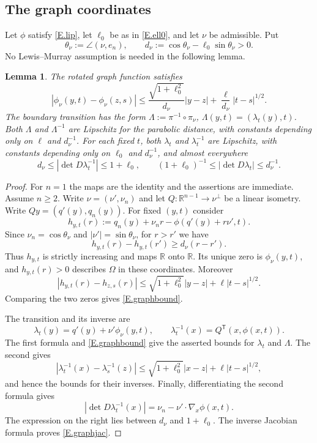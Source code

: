 \documentclass[10pt,a4paper]{amsart}
\numberwithin{equation}{section}
\newcommand{\R}{\mathbb R}
\newcommand{\om}{\Omega}
\newtheorem{lemma}[equation]{Lemma}
\begin{document}
\subsection{The graph coordinates}\label{ss.graphgeometry}

Let $\phi$ satisfy \eqref{E.lip}, let $\ell_0$ be as in \eqref{E.ell0}, and
let $\nu$ be admissible. Put
\begin{equation}\label{E.transversality}
 \theta_\nu:=\angle(\nu,e_n),\qquad
 d_\nu:=\cos\theta_\nu-\ell_0\sin\theta_\nu>0.
\end{equation}
No Lewis--Murray assumption is needed in the following lemma.

\begin{lemma}\label{L.graphgeometry}
The rotated graph function satisfies
\begin{equation}\label{E.graphbound}
 |\phi_\nu(y,t)-\phi_\nu(z,s)|
 \le \frac{\sqrt{1+\ell_0^2}}{d_\nu}|y-z|
      +\frac{\ell}{d_\nu}|t-s|^{1/2}.
\end{equation}
The boundary transition has the form
$\Lambda:=\pi^{-1}\circ\pi_\nu$, $\Lambda(y,t)=(\lambda_t(y),t)$.
Both $\Lambda$ and $\Lambda^{-1}$ are Lipschitz for the parabolic distance,
with constants depending only on $\ell$ and $d_\nu^{-1}$. For each fixed $t$,
both $\lambda_t$ and $\lambda_t^{-1}$ are Lipschitz, with constants depending
only on $\ell_0$ and $d_\nu^{-1}$, and almost everywhere
\begin{equation}\label{E.graphjac}
 d_\nu\le |\det D\lambda_t^{-1}|\le1+\ell_0,\qquad
 (1+\ell_0)^{-1}\le |\det D\lambda_t|\le d_\nu^{-1}.
\end{equation}
\end{lemma}

\begin{proof}
For $n=1$ the maps are the identity and the assertions are immediate.
Assume $n\ge2$. Write $\nu=(\nu',\nu_n)$ and let
$Q:\R^{n-1}\to\nu^\perp$ be a linear isometry. Write
$Qy=(q'(y),q_n(y))$. For fixed $(y,t)$ consider
$$h_{y,t}(r):=q_n(y)+\nu_n r-\phi(q'(y)+r\nu',t).$$
Since $\nu_n=\cos\theta_\nu$ and $|\nu'|=\sin\theta_\nu$, for $r>r'$ we have
$$h_{y,t}(r)-h_{y,t}(r')\ge d_\nu(r-r').$$
Thus $h_{y,t}$ is strictly increasing and maps $\R$ onto $\R$. Its unique
zero is $\phi_\nu(y,t)$, and $h_{y,t}(r)>0$ describes $\om$ in these
coordinates. Moreover
\[
 |h_{y,t}(r)-h_{z,s}(r)|
 \le \sqrt{1+\ell_0^2}|y-z|+\ell|t-s|^{1/2}.
\]
Comparing the two zeros gives \eqref{E.graphbound}.\medskip

\noindent The transition and its inverse are
\[
 \lambda_t(y)=q'(y)+\nu'\phi_\nu(y,t),\qquad
 \lambda_t^{-1}(x)=Q^{\mathsf T}(x,\phi(x,t)).
\]
The first formula and \eqref{E.graphbound} give the asserted bounds for
$\lambda_t$ and $\Lambda$. The second gives
\[
 |\lambda_t^{-1}(x)-\lambda_s^{-1}(z)|
 \le \sqrt{1+\ell_0^2}|x-z|+\ell|t-s|^{1/2},
\]
and hence the bounds for their inverses. Finally, differentiating the
second formula gives
$$|\det D\lambda_t^{-1}(x)|
   =\nu_n-\nu'\cdot\nabla_x\phi(x,t).$$
The expression on the right lies between $d_\nu$ and $1+\ell_0$.
The inverse Jacobian formula proves \eqref{E.graphjac}.
\end{proof}
\end{document}
